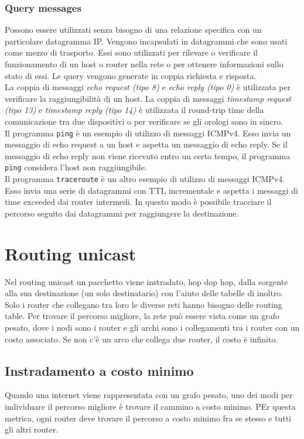 \documentclass[12pt]{report}
\begin{document}
\subsubsection{Query messages}
Possono essere utilizzati senza bisogno di una relazione specifica con un particolare datagramma IP. Vengono incapsulati in datagrammi che sono usati come mezzo di trasporto. Essi sono utilizzati per rilevare o verificare il funzionamento di un host o router nella rete o per ottenere informazioni sullo stato di essi. Le query vengono generate in coppia richiesta e risposta.
\vspace{\baselineskip}\\
La coppia di messaggi \textit{echo request (tipo 8)} e \textit{echo reply (tipo 0)} è utilizzata per verificare la raggiungibilità di un host. La coppia di messaggi \textit{timestamp request (tipo 13)} e \textit{timestamp reply (tipo 14)} è utilizzata il round-trip time della comunicazione tra due dispositivi o per verificare se gli orologi sono in sincro.
\vspace{\baselineskip}\\
Il programma \texttt{ping} è un esempio di utilizzo di messaggi ICMPv4. Esso invia un messaggio di echo request a un host e aspetta un messaggio di echo reply. Se il messaggio di echo reply non viene ricevuto entro un certo tempo, il programma \texttt{ping} considera l'host non raggiungibile.\\
Il programma \texttt{traceroute} è un altro esempio di utilizzo di messaggi ICMPv4. Esso invia una serie di datagrammi con TTL incrementale e aspetta i messaggi di time exceeded dai router intermedi. In questo modo è possibile tracciare il percorso seguito dai datagrammi per raggiungere la destinazione.

\section{Routing unicast}
Nel routing unicast un pacchetto viene instradato, hop dop hop, dalla sorgente alla sua destinazione (un solo destinatario) con l'aiuto delle tabelle di inoltro. Solo i router che collegano tra loro le diverse reti hanno bisogno delle routing table. Per trovare il percorso migliore, la rete può essere vista come un grafo pesato, dove i nodi sono i router e gli archi sono i collegamenti tra i router con un costo associato. Se non c'è un arco che collega due router, il costo è infinito.

\subsection{Instradamento a costo minimo}
Quando una internet viene rappresentata con un grafo pesato, uno dei modi per individuare il percorso migliore è trovare il cammino a costo minimo. PEr questa metrica, ogni router deve trovare il percorso a costo minimo fra se stesso e tutti gli altri router.
\end{document}
